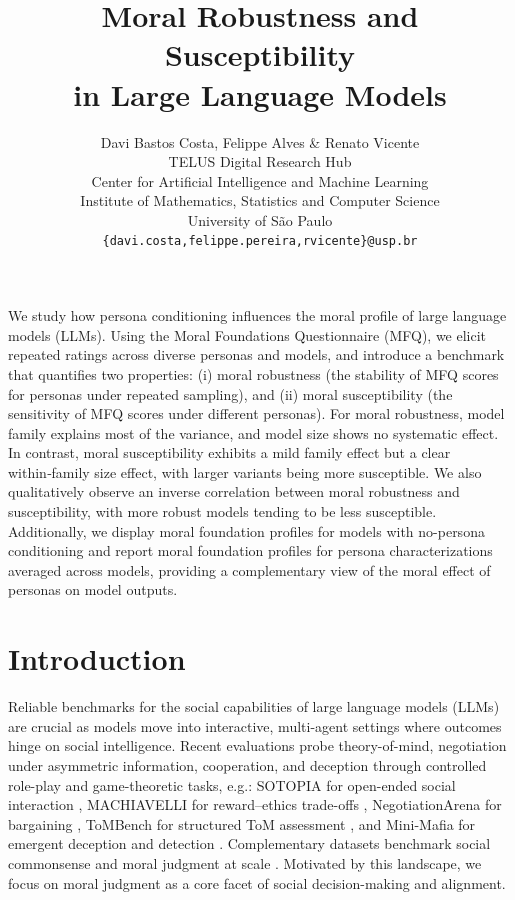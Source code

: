 \documentclass{article}
\title{Moral Robustness and Susceptibility\\ in Large Language Models}
\author{Davi Bastos Costa, Felippe Alves \& Renato Vicente \\
TELUS Digital Research Hub\\ 
Center for Artificial Intelligence and Machine Learning\\
Institute of Mathematics, Statistics and Computer Science\\
University of São Paulo \\
\texttt{\{davi.costa,felippe.pereira,rvicente\}@usp.br} \\
}
\begin{document}
\maketitle

\begin{abstract}
\end{abstract}
We study how persona conditioning influences the moral profile of large language models (LLMs). Using the Moral Foundations Questionnaire (MFQ), we elicit repeated ratings across diverse personas and models, and introduce a benchmark that quantifies two properties: (i) moral robustness (the stability of MFQ scores for personas under repeated sampling), and (ii) moral susceptibility (the sensitivity of MFQ scores under different personas). For moral robustness, model family explains most of the variance, and model size shows no systematic effect. In contrast, moral susceptibility exhibits a mild family effect but a clear within‑family size effect, with larger variants being more susceptible. We also qualitatively observe an inverse correlation between moral robustness and susceptibility, with more robust models tending to be less susceptible. Additionally, we display moral foundation profiles for models with no-persona conditioning and report moral foundation profiles for persona characterizations averaged across models, providing a complementary view of the moral effect of personas on model outputs.

\section{Introduction}
Reliable benchmarks for the social capabilities of large language models (LLMs) are crucial as models move into interactive, multi-agent settings where outcomes hinge on social intelligence. Recent evaluations probe theory-of-mind, negotiation under asymmetric information, cooperation, and deception through controlled role-play and game-theoretic tasks, e.g.: SOTOPIA for open-ended social interaction \cite{zhou2024sotopia}, MACHIAVELLI for reward–ethics trade-offs \cite{pan2023machiavelli}, NegotiationArena for bargaining \cite{bianchi2024negotiationarena}, ToMBench for structured ToM assessment \cite{chen-etal-2024-tombench}, and Mini-Mafia for emergent deception and detection \cite{costa2025deceivedetectdiscloselarge}. Complementary datasets benchmark social commonsense and moral judgment at scale \cite{sap-etal-2019-social,hendrycks2021ethics}. Motivated by this landscape, we focus on moral judgment as a core facet of social decision-making and alignment.
\end{document}

